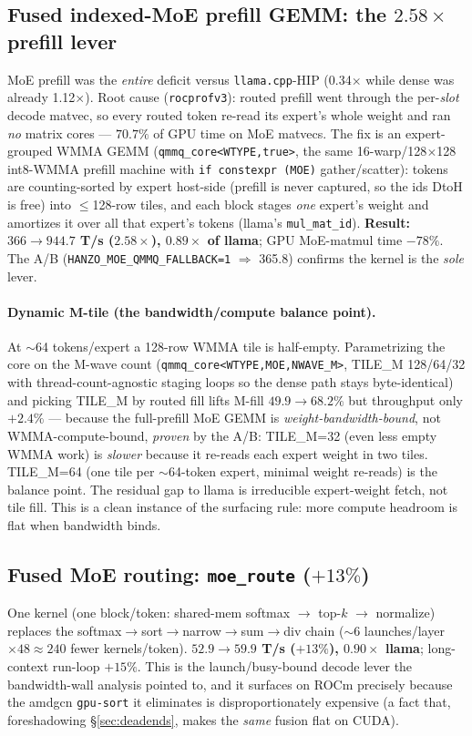\documentclass[11pt]{article}
\newcommand{\x}{\ensuremath{\times}}
\begin{document}
\subsection{Fused indexed-MoE prefill GEMM: the $2.58\x$ prefill lever}
MoE prefill was the \emph{entire} deficit versus \texttt{llama.cpp}-HIP (0.34\x{} while dense was
already 1.12\x). Root cause (\texttt{rocprofv3}): routed prefill went through the per-\emph{slot}
decode matvec, so every routed token re-read its expert's whole weight and ran \emph{no} matrix
cores --- $70.7\%$ of GPU time on MoE matvecs. The fix is an expert-grouped WMMA GEMM
(\texttt{qmmq\_core<WTYPE,true>}, the same 16-warp/128$\times$128 int8-WMMA prefill machine with
\texttt{if constexpr (MOE)} gather/scatter): tokens are counting-sorted by expert host-side
(prefill is never captured, so the ids DtoH is free) into $\le$128-row tiles, and each block stages
\emph{one} expert's weight and amortizes it over all that expert's tokens (llama's
\texttt{mul\_mat\_id}). \textbf{Result: $366\to944.7$ T/s ($2.58\x$), $0.89\x$ of llama};
GPU MoE-matmul time $-78\%$. The A/B (\texttt{HANZO\_MOE\_QMMQ\_FALLBACK=1} $\Rightarrow$ 365.8)
confirms the kernel is the \emph{sole} lever.

\paragraph{Dynamic M-tile (the bandwidth/compute balance point).} At $\sim$64 tokens/expert a
128-row WMMA tile is half-empty. Parametrizing the core on the M-wave count
(\texttt{qmmq\_core<WTYPE,MOE,NWAVE\_M>}, TILE\_M 128/64/32 with thread-count-agnostic staging
loops so the dense path stays byte-identical) and picking TILE\_M by routed fill lifts M-fill
$49.9\to68.2\%$ but throughput only $+2.4\%$ --- because the full-prefill MoE GEMM is
\emph{weight-bandwidth-bound}, not WMMA-compute-bound, \emph{proven} by the A/B: TILE\_M=32 (even
less empty WMMA work) is \emph{slower} because it re-reads each expert weight in two tiles. TILE\_M=64
(one tile per $\sim$64-token expert, minimal weight re-reads) is the balance point. The residual gap
to llama is irreducible expert-weight fetch, not tile fill. This is a clean instance of the
surfacing rule: more compute headroom is flat when bandwidth binds.

\subsection{Fused MoE routing: \texttt{moe\_route} ($+13\%$)}
One kernel (one block/token: shared-mem softmax $\to$ top-$k$ $\to$ normalize) replaces the
softmax$\to$sort$\to$narrow$\to$sum$\to$div chain ($\sim$6 launches/layer $\times 48 \approx 240$
fewer kernels/token). \textbf{$52.9\to59.9$ T/s ($+13\%$), $0.90\x$ llama}; long-context run-loop
$+15\%$. This is the launch/busy-bound decode lever the bandwidth-wall analysis pointed to, and it
surfaces on ROCm precisely because the amdgcn \texttt{gpu-sort} it eliminates is disproportionately
expensive (a fact that, foreshadowing \S\ref{sec:deadends}, makes the \emph{same} fusion flat on
CUDA).
\end{document}
